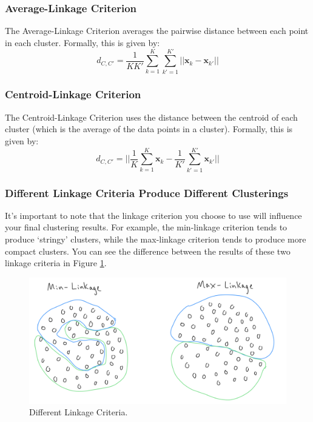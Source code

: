 \subsubsection{Average-Linkage Criterion}
The Average-Linkage Criterion averages the pairwise distance between each point in each cluster. Formally, this is given by:
\begin{equation} \label{avg-linkage-crit}
	d_{C, C'} = \frac{1}{K K'} \sum_{k=1}^{K} \sum_{k'=1}^{K'} || \textbf{x}_{k} - \textbf{x}_{k'} ||
\end{equation}

\subsubsection{Centroid-Linkage Criterion}
The Centroid-Linkage Criterion uses the distance between the centroid of each cluster (which is the average of the data points in a cluster). Formally, this is given by:
\begin{equation} \label{cent-linkage-crit}
	d_{C, C'} = || \frac{1}{K} \sum_{k=1}^{K} \textbf{x}_{k} - \frac{1}{K'} \sum_{k'=1}^{K'} \textbf{x}_{k'} ||
\end{equation}

\subsubsection{Different Linkage Criteria Produce Different Clusterings}
It's important to note that the linkage criterion you choose to use will influence your final clustering results. For example, the min-linkage criterion tends to produce `stringy' clusters, while the max-linkage criterion tends to produce more compact clusters. You can see the difference between the results of these two linkage criteria in Figure \ref{fig:diff-linkage-criteria}.

\begin{figure}
    \centering
    \includegraphics[width=0.5\paperwidth]{../Clustering/fig/diff-linkage-criteria.png}
    \caption{Different Linkage Criteria.}
    \label{fig:diff-linkage-criteria}
\end{figure}

